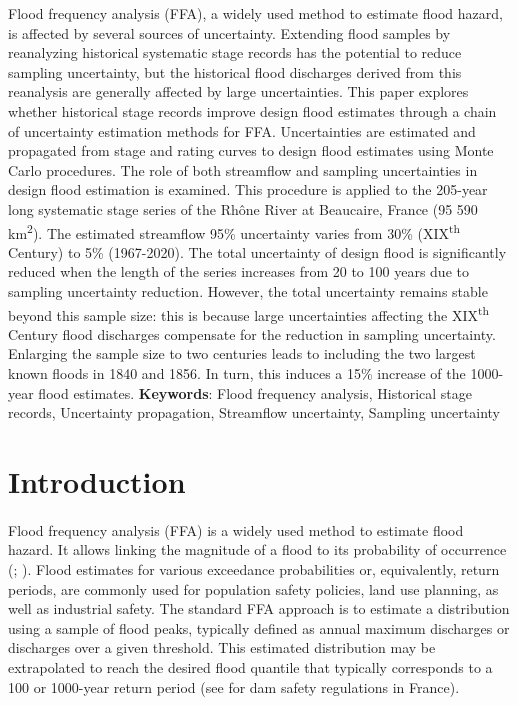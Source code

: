     Flood frequency analysis (FFA), a widely used method to estimate flood hazard, is affected by several sources of uncertainty. Extending flood samples by reanalyzing historical systematic stage records has the potential to reduce sampling uncertainty, but the historical flood discharges derived from this reanalysis are generally affected by large uncertainties. This paper explores whether historical stage records improve design flood estimates through a chain of uncertainty estimation methods for FFA. Uncertainties are estimated and propagated from stage and rating curves to design flood estimates using Monte Carlo procedures. The role of both streamflow and sampling uncertainties in design flood estimation is examined. This procedure  is applied to the 205-year long systematic stage series of the Rhône River at Beaucaire, France (95 590 km\textsuperscript{2}). The estimated streamflow 95\% uncertainty varies from 30\% (XIX\textsuperscript{th} Century) to 5\% (1967-2020). The total uncertainty of design flood is significantly reduced when the length of the series increases from 20 to 100 years due to sampling uncertainty reduction. However, the total uncertainty remains stable beyond this sample size: this is because large uncertainties affecting the XIX\textsuperscript{th} Century flood discharges compensate for the reduction in sampling uncertainty. Enlarging the sample size to two centuries leads to including the two largest known floods in 1840 and 1856. In turn, this induces a 15\% increase of the 1000-year flood estimates.
    \newline
    \textbf{Keywords}: Flood frequency analysis, Historical stage records, Uncertainty propagation, Streamflow uncertainty, Sampling uncertainty
        

\section{Introduction}
    \paragraph{}
    Flood frequency analysis (FFA) is a widely used method to estimate flood hazard. It allows linking the magnitude of a flood to its probability of occurrence (\citet{hamed_flood_2019}; \citet{jain_design_2019}). Flood estimates for various exceedance probabilities or, equivalently, return periods, are commonly used for population safety policies, land use planning, as well as industrial safety. The standard FFA approach is to estimate a distribution using a sample of flood peaks, typically defined as annual maximum discharges or discharges over a given threshold. This estimated distribution may be extrapolated to reach the desired flood quantile that typically corresponds to a 100 or 1000-year return period (see \cite{le_delliou_recommandations_2014} for dam safety regulations in France). 
    
